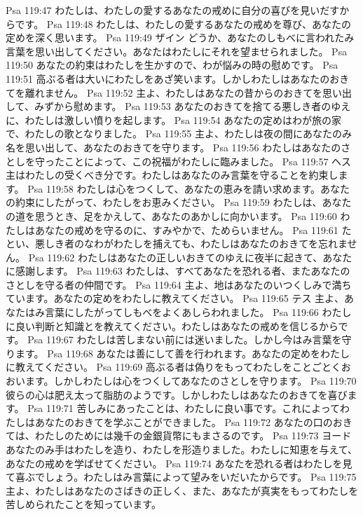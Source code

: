 Psa 119:47  わたしは、わたしの愛するあなたの戒めに自分の喜びを見いだすからです。
Psa 119:48  わたしは、わたしの愛するあなたの戒めを尊び、あなたの定めを深く思います。
Psa 119:49  ザイン どうか、あなたのしもべに言われたみ言葉を思い出してください。あなたはわたしにそれを望ませられました。
Psa 119:50  あなたの約束はわたしを生かすので、わが悩みの時の慰めです。
Psa 119:51  高ぶる者は大いにわたしをあざ笑います。しかしわたしはあなたのおきてを離れません。
Psa 119:52  主よ、わたしはあなたの昔からのおきてを思い出して、みずから慰めます。
Psa 119:53  あなたのおきてを捨てる悪しき者のゆえに、わたしは激しい憤りを起します。
Psa 119:54  あなたの定めはわが旅の家で、わたしの歌となりました。
Psa 119:55  主よ、わたしは夜の間にあなたのみ名を思い出して、あなたのおきてを守ります。
Psa 119:56  わたしはあなたのさとしを守ったことによって、この祝福がわたしに臨みました。
Psa 119:57  ヘス 主はわたしの受くべき分です。わたしはあなたのみ言葉を守ることを約束します。
Psa 119:58  わたしは心をつくして、あなたの恵みを請い求めます。あなたの約束にしたがって、わたしをお恵みください。
Psa 119:59  わたしは、あなたの道を思うとき、足をかえして、あなたのあかしに向かいます。
Psa 119:60  わたしはあなたの戒めを守るのに、すみやかで、ためらいません。
Psa 119:61  たとい、悪しき者のなわがわたしを捕えても、わたしはあなたのおきてを忘れません。
Psa 119:62  わたしはあなたの正しいおきてのゆえに夜半に起きて、あなたに感謝します。
Psa 119:63  わたしは、すべてあなたを恐れる者、またあなたのさとしを守る者の仲間です。
Psa 119:64  主よ、地はあなたのいつくしみで満ちています。あなたの定めをわたしに教えてください。
Psa 119:65  テス 主よ、あなたはみ言葉にしたがってしもべをよくあしらわれました。
Psa 119:66  わたしに良い判断と知識とを教えてください。わたしはあなたの戒めを信じるからです。
Psa 119:67  わたしは苦しまない前には迷いました。しかし今はみ言葉を守ります。
Psa 119:68  あなたは善にして善を行われます。あなたの定めをわたしに教えてください。
Psa 119:69  高ぶる者は偽りをもってわたしをことごとくおおいます。しかしわたしは心をつくしてあなたのさとしを守ります。
Psa 119:70  彼らの心は肥え太って脂肪のようです。しかしわたしはあなたのおきてを喜びます。
Psa 119:71  苦しみにあったことは、わたしに良い事です。これによってわたしはあなたのおきてを学ぶことができました。
Psa 119:72  あなたの口のおきては、わたしのためには幾千の金銀貨幣にもまさるのです。
Psa 119:73  ヨード あなたのみ手はわたしを造り、わたしを形造りました。わたしに知恵を与えて、あなたの戒めを学ばせてください。
Psa 119:74  あなたを恐れる者はわたしを見て喜ぶでしょう。わたしはみ言葉によって望みをいだいたからです。
Psa 119:75  主よ、わたしはあなたのさばきの正しく、また、あなたが真実をもってわたしを苦しめられたことを知っています。
